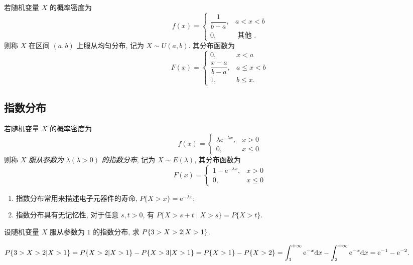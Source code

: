 \begin{definition}[均匀分布]
    若随机变量 $ X $ 的概率密度为
    $$f(x)=\begin{cases}
            \dfrac{1}{b-a}, & a<x<b           \\[6pt]
            0,              & \text { 其他 .}
        \end{cases}$$
    则称 $ X $ 在区间 $ (a, b)$ 上服从均匀分布, 记为 $ X \sim U(a, b) $.
    其分布函数为
    $$F(x)=\begin{cases}
            0,                & x<a             \\
            \dfrac{x-a}{b-a}, & a \leqslant x<b \\[6pt]
            1,                & b \leqslant x.
        \end{cases}$$
\end{definition}

\subsection{指数分布}

\begin{definition}[指数分布]
    若随机变量 $ X $ 的概率密度为
    $$f(x)=\begin{cases}
            \lambda \mathrm{e}^{-\lambda x}, & x>0           \\
            0,                               & x \leqslant 0
        \end{cases}$$
    则称 $ X $ \textit{服从参数为} $ \lambda(\lambda>0) $ \textit{的指数分布}, 记为 $ X \sim E(\lambda) $, 其分布函数为
    $$F(x)=\begin{cases}
            1-\mathrm{e}^{-\lambda x}, & x>0           \\
            0,                         & x \leqslant 0
        \end{cases}$$
    \begin{enumerate}[label=(\arabic{*})]
        \item 指数分布常用来描述电子元器件的寿命, $P\{X>x\}=\mathrm{e}^{-\lambda x} $;
        \item 指数分布具有无记忆性, 对于任意 $ s, t>0$, 有 $P\{X>s+t \mid X>s\}=P\{X>t\} .$
    \end{enumerate}
\end{definition}

\begin{example}
    设随机变量 $X$ 服从参数为 $1$ 的指数分布, 求 $P\qty{3>X>2|X>1}$.
\end{example}
\begin{solution}
    $\displaystyle P\qty{3>X>2|X>1}=P\qty{X>2|X>1}-P\qty{X>3|X>1}=P\qty{X>1}-P\qty{X>2}=\int_{1}^{+\infty} \mathrm{e} ^{-x} \dd x-\int_{2}^{+\infty} \mathrm{e} ^{-x} \dd x=\mathrm{e} ^{-1}-\mathrm{e} ^{-2}.$
\end{solution}

